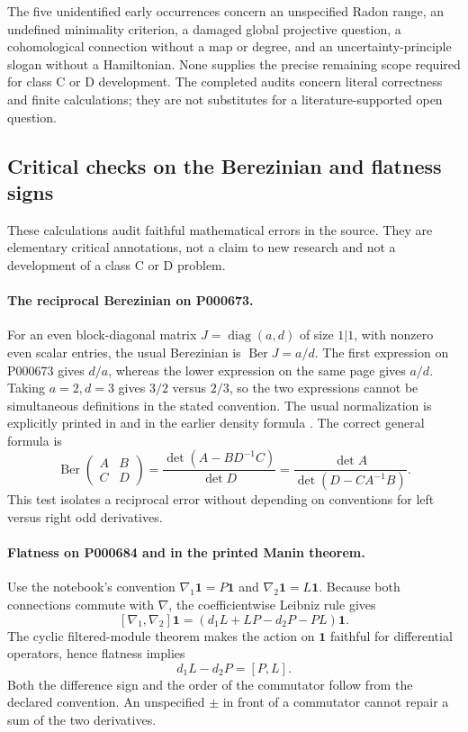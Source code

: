 \begin{remark}
The five unidentified early occurrences concern an unspecified Radon range, an undefined minimality criterion, a damaged global projective question, a cohomological connection without a map or degree, and an uncertainty-principle slogan without a Hamiltonian. None supplies the precise remaining scope required for class C or D development. The completed audits concern literal correctness and finite calculations; they are not substitutes for a literature-supported open question.
\end{remark}


\subsection{Critical checks on the Berezinian and flatness signs}

These calculations audit faithful mathematical errors in the source. They are
elementary critical annotations, not a claim to new research and not a development
of a class C or D problem.

\paragraph{The reciprocal Berezinian on P000673.}\oursComputed{}
For an even block-diagonal matrix \(J=\operatorname{diag}(a,d)\) of size
\(1|1\), with nonzero even scalar entries, the usual Berezinian is
\(\operatorname{Ber}J=a/d\). The first expression on P000673 gives \(d/a\),
whereas the lower expression on the same page gives \(a/d\).
Taking \(a=2,d=3\) gives \(3/2\) versus \(2/3\), so the two expressions
cannot be simultaneous definitions in the stated convention.
The usual normalization is explicitly printed in
\citet[\S1]{bernsteinleites1977integral} and in the earlier density formula
\citep[formula~(3)]{berezinleites1975supermanifolds}.
The correct general formula is
\[
 \operatorname{Ber}\begin{pmatrix}A&B\\C&D\end{pmatrix}
 =\frac{\det(A-BD^{-1}C)}{\det D}
 =\frac{\det A}{\det(D-CA^{-1}B)}.
\]
This test isolates a reciprocal error without depending on conventions for
left versus right odd derivatives.

\paragraph{Flatness on P000684 and in the printed Manin theorem.}\ours{}
Use the notebook's convention
\(\nabla_1\mathbf1=P\mathbf1\) and
\(\nabla_2\mathbf1=L\mathbf1\).
Because both connections commute with \(\nabla\), the coefficientwise
Leibniz rule gives
\[
 [\nabla_1,\nabla_2]\mathbf1
 = (d_1L+LP-d_2P-PL)\mathbf1.
\]
The cyclic filtered-module theorem makes the action on \(\mathbf1\)
faithful for differential operators, hence flatness implies
\[
 d_1L-d_2P=[P,L].
\]
Both the difference sign and the order of the commutator follow from the
declared convention. An unspecified \(\pm\) in front of a commutator cannot
repair a sum of the two derivatives.

